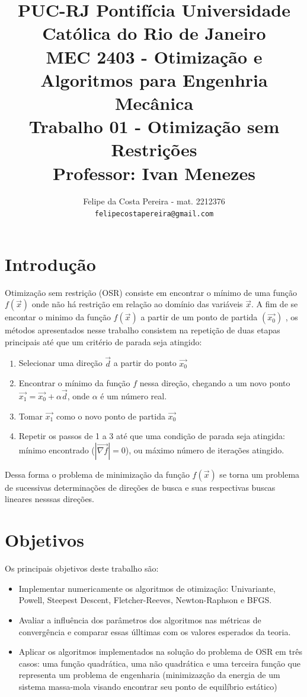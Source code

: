 \documentclass[10pt, a4paper]{article}
\title{PUC-RJ Pontif\'icia Universidade Cat\'olica do Rio de Janeiro \\ MEC 2403 - Otimiza\c c\~ao e Algoritmos para Engenhria Mec\^anica \\ Trabalho 01 - Otimiza\c c\~ao  sem Restri\c c\~oes  \\
\large Professor: Ivan Menezes}
\author{Felipe da Costa Pereira - mat. 2212376 \\ {\tt felipecostapereira@gmail.com}}
\begin{document}
\maketitle

\section{Introdu\c c\~ao}

Otimiza\c c\~ao sem restri\c c\~ao (OSR) consiste em encontrar o m\'inimo de uma fun\c c\~ao $f(\vec{x})$ onde n\~ao h\'a restri\c c\~ao em rela\c c\~ao ao dom\'inio das vari\'aveis $\vec{x}$. A fim de se encontar o minimo da fun\c c\~ao $f(\vec{x})$ a partir de um ponto de partida $(\vec{x_{0}})$ , os m\'etodos apresentados nesse trabalho consistem na repeti\c c\~ao de duas etapas principais at\'e que um crit\'erio de parada seja atingido:
\begin{enumerate}
      \item Selecionar uma dire\c c\~ao $\vec{d}$ a partir do ponto $\vec{x_{0}}$
      \item Encontrar o m\'inimo da fun\c c\~ao $f$ nessa dire\c c\~ao, chegando a um novo ponto $\vec{x_{1}} = \vec{x_{0}} + \alpha\vec{d}$, onde $\alpha$ \'e um n\'umero real.
      \item Tomar $\vec{x_{1}}$ como o novo ponto de partida $\vec{x_{0}}$
      \item Repetir os passos de 1 a 3 at\'e que uma condi\c c\~ao de parada seja atingida: m\'inimo encontrado ($|\vec{\nabla f}|=0$), ou m\'aximo n\'umero de itera\c c\~oes atingido.
\end{enumerate}

Dessa forma o problema de minimiza\c c\~ao da fun\c c\~ao $f(\vec{x})$ se torna um problema de sucessivas determina\c c\~oes de dire\c c\~oes de busca e suas respectivas buscas lineares nesssas dire\c c\~oes.

\section{Objetivos}

Os principais objetivos deste trabalho s\~ao:
\begin{itemize}
      \item Implementar numericamente os algoritmos de otimiza\c c\~ao: Univariante, Powell, Steepest Descent, Fletcher-Reeves, Newton-Raphson e BFGS.
      \item Avaliar a influ\^encia dos par\^ametros dos algoritmos nas m\'etricas de converg\^encia e comparar essas \'ulltimas com os valores esperados da teoria.
      \item Aplicar os algoritmos implementados na solu\c c\~ao do problema de OSR em tr\^es casos: uma fun\c c\~ao quadr\'atica, uma n\~ao quadr\'atica e uma terceira fun\c c\~ao que representa um problema de engenharia (minimizaz\c c\~ao da energia de um sistema massa-mola visando encontrar seu ponto de equil\'ibrio est\'atico)
\end{itemize}
\end{document}
